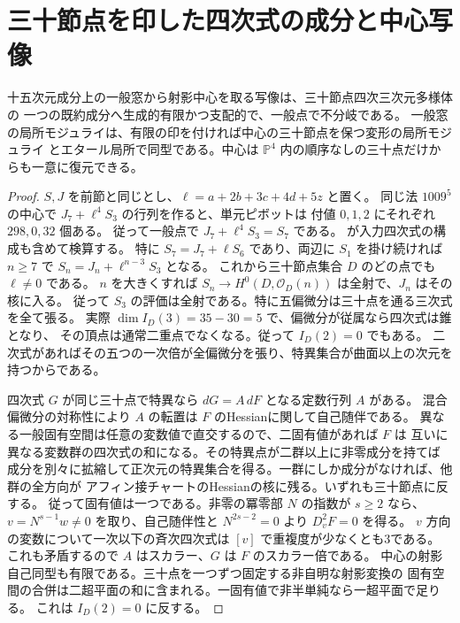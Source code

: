 \section{三十節点を印した四次式の成分と中心写像}
\label{sec:thirty-node-center-map}
\begin{theorem}\label{thm:thirty-node-center-map}
十五次元成分上の一般窓から射影中心を取る写像は、三十節点四次三次元多様体の
一つの既約成分へ生成的有限かつ支配的で、一般点で不分岐である。
一般窓の局所モジュライは、有限の印を付ければ中心の三十節点を保つ変形の局所モジュライ
とエタール局所で同型である。中心は $\mathbb P^4$ 内の順序なしの三十点だけからも一意に復元できる。
\end{theorem}
\begin{proof}
$S,J$ を前節と同じとし、$\ell=a+2b+3c+4d+5z$ と置く。
同じ法 $1009^5$ の中心で $J_7+\ell^4 S_3$ の行列を作ると、単元ピボットは
付値 $0,1,2$ にそれぞれ $298,0,32$ 個ある。
従って一般点で $J_7+\ell^4 S_3=S_7$ である。
 が入力四次式の構成も含めて検算する。
特に $S_7=J_7+\ell S_6$ であり、両辺に $S_1$ を掛け続ければ
$n\ge7$ で $S_n=J_n+\ell^{n-3}S_3$ となる。
これから三十節点集合 $D$ のどの点でも $\ell\ne0$ である。
$n$ を大きくすれば $S_n\to H^0(D,\mathcal O_D(n))$ は全射で、$J_n$ はその核に入る。
従って $S_3$ の評価は全射である。特に五偏微分は三十点を通る三次式を全て張る。
実際 $\dim I_D(3)=35-30=5$ で、偏微分が従属なら四次式は錐となり、
その頂点は通常二重点でなくなる。従って $I_D(2)=0$ でもある。
二次式があればその五つの一次倍が全偏微分を張り、特異集合が曲面以上の次元を持つからである。

四次式 $G$ が同じ三十点で特異なら $dG=A\,dF$ となる定数行列 $A$ がある。
混合偏微分の対称性により $A$ の転置は $F$ のHessianに関して自己随伴である。
異なる一般固有空間は任意の変数値で直交するので、二固有値があれば $F$ は
互いに異なる変数群の四次式の和になる。その特異点が二群以上に非零成分を持てば
成分を別々に拡縮して正次元の特異集合を得る。一群にしか成分がなければ、他群の全方向が
アフィン接チャートのHessianの核に残る。いずれも三十節点に反する。
従って固有値は一つである。非零の冪零部 $N$ の指数が $s\ge2$ なら、
$v=N^{s-1}w\ne0$ を取り、自己随伴性と $N^{2s-2}=0$ より $D_v^2F=0$ を得る。
$v$ 方向の変数について一次以下の斉次四次式は $[v]$ で重複度が少なくとも3である。
これも矛盾するので $A$ はスカラー、$G$ は $F$ のスカラー倍である。
中心の射影自己同型も有限である。三十点を一つずつ固定する非自明な射影変換の
固有空間の合併は二超平面の和に含まれる。一固有値で非半単純なら一超平面で足りる。
これは $I_D(2)=0$ に反する。


\end{proof}
